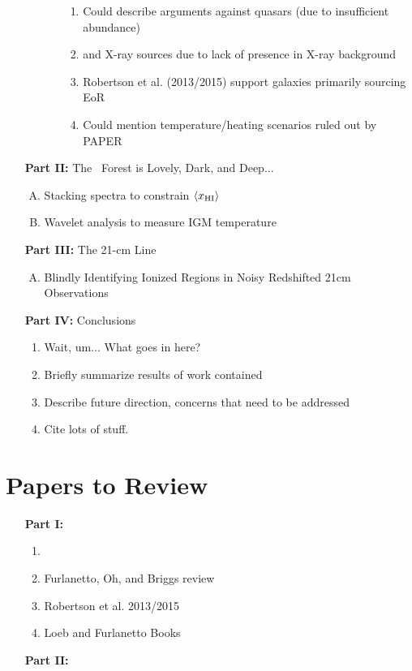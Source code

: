 \documentclass[11pt]{article}
\begin{document}
\begin{enumerate}
\begin{enumerate}[1.]
\begin{enumerate}[A.]
\begin{enumerate}[$\to$]
\item Could describe arguments against quasars (due to insufficient abundance) 
\item and X-ray sources due to lack of presence in X-ray background
\item Robertson et al. (2013/2015) support galaxies primarily sourcing EoR
\item Could mention temperature/heating scenarios ruled out by PAPER
\end{enumerate}
\end{enumerate}
\end{enumerate}




\item [{\bf Part II:}] The \lya\ Forest is Lovely, Dark, and Deep...
\begin{enumerate}[A.]
\item Stacking spectra to constrain $\langle x_{\text{HI}}\rangle$
\item Wavelet analysis to measure IGM temperature
\end{enumerate}
\item [{\bf Part III:}] The 21-cm Line
\begin{enumerate}[A.]
\item Blindly Identifying Ionized Regions in Noisy Redshifted 21cm Observations
\end{enumerate}
\item [{\bf Part IV:}] Conclusions
\begin{enumerate}[$\to$]
\item Wait, um... What goes in here?
\item Briefly summarize results of work contained 
\item Describe future direction, concerns that need to be addressed
\item Cite lots of stuff.
\end{enumerate}
\end{enumerate}






\section*{Papers to Review}
\begin{enumerate}
\item [{\bf Part I:}]
\begin{enumerate}[-]
\item 
\item Furlanetto, Oh, and Briggs review
\item Robertson et al. 2013/2015
\item Loeb and Furlanetto Books
\end{enumerate}
\item [{\bf Part II:}] 
\end{enumerate}
\end{document}
